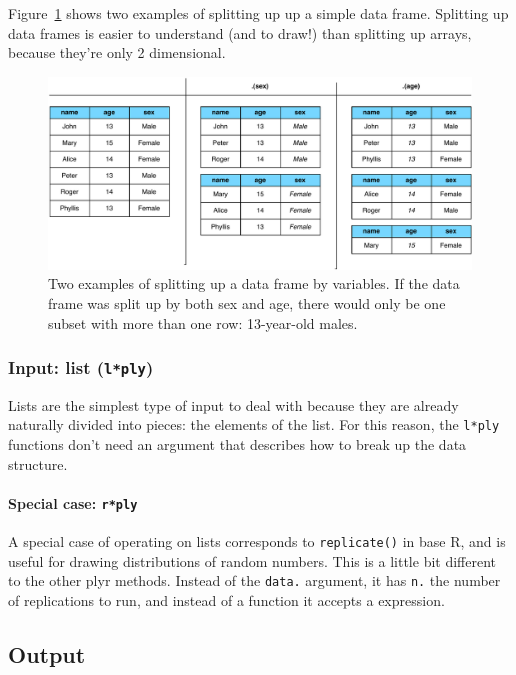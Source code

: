 \documentclass{scrartcl}
\newcommand{\code}[1]{\lstinline!#1!}
\newcommand{\f}[1]{\lstinline!#1()!}
\begin{document}
Figure~\ref{fig:split-data-frame} shows two examples of splitting up up a simple data frame.  Splitting up data frames is easier to understand (and to draw!) than splitting up arrays, because they're only 2 dimensional.

\begin{figure}[htbp]
  \centering
    \includegraphics[width= \textwidth]{input-d}
  \caption{Two examples of splitting up a data frame by variables.  If the data frame was split up by both sex and age, there would only be one subset with more than one row: 13-year-old males.}
  \label{fig:split-data-frame}
\end{figure}


\subsubsection{Input: list (\code{l*ply})} 

Lists are the simplest type of input to deal with because they are already naturally divided into pieces: the elements of the list.  For this reason, the \code{l*ply} functions don't need an argument that describes how to break up the data structure.

\paragraph{Special case: \code{r*ply}}  A special case of operating on lists corresponds to \f{replicate} in base R, and is useful for drawing distributions of random numbers.  This is a little bit different to the other plyr methods.  Instead of the \code{data.} argument, it has \code{n.} the number of replications to run, and instead of a function it accepts a expression.  

\subsection{Output}
\label{sec:output}
\end{document}
